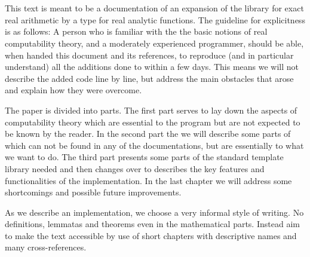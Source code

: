 \section*{}
	
	This text is meant to be a documentation of an expansion of the \cc library \irram for exact real arithmetic by a type for real analytic functions.
	The guideline for explicitness is as follows:
	A person who is familiar with the the basic notions of real computability theory, and a moderately experienced \cc programmer, should be able, when handed this document and its references, to reproduce (and in particular understand) all the additions done to \irram within a few days.
	This means we will not describe the added code line by line, but address the main obstacles that arose and explain how they were overcome.


	The paper is divided into  parts. The first part serves to lay down the aspects of computability theory which are essential to the program but are not expected to be known by the reader. In the second part the we will describe some parts of \irram which can not be found in any of the documentations, but are essentially to what we want to do. The third part presents some parts of the \ccOx standard template library needed and then changes over to describes the key features and functionalities of the implementation. In the last chapter we will address some shortcomings and possible future improvements.

	As we describe an implementation, we choose a very informal style of writing. No definitions, lemmatas and theorems even in the mathematical parts. Instead aim to make the text accessible by use of short chapters with descriptive names and many cross-references. 